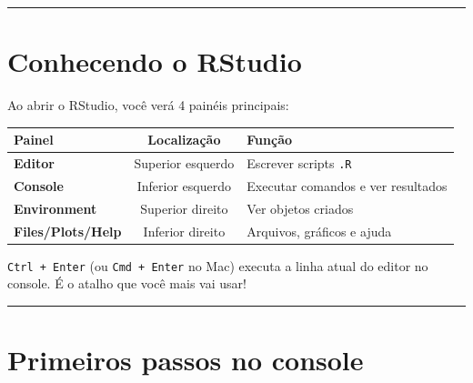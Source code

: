 \documentclass[
  letterpaper,
]{scrbook}
\newcounter{none} %
\begin{document}
\begin{center}\rule{0.5\linewidth}{0.5pt}\end{center}

\section{Conhecendo o RStudio}\label{conhecendo-o-rstudio}

Ao abrir o RStudio, você verá 4 painéis principais:

{\def\LTcaptype{none} %
\begin{longtable}[]{@{}lcl@{}}
\toprule\noalign{}
Painel & Localização & Função \\
\midrule\noalign{}
\endhead
\bottomrule\noalign{}
\endlastfoot
\textbf{Editor} & Superior esquerdo & Escrever scripts \texttt{.R} \\
\textbf{Console} & Inferior esquerdo & Executar comandos e ver
resultados \\
\textbf{Environment} & Superior direito & Ver objetos criados \\
\textbf{Files/Plots/Help} & Inferior direito & Arquivos, gráficos e
ajuda \\
\end{longtable}
}

\begin{tcolorbox}[enhanced jigsaw, arc=.35mm, bottomrule=.15mm, bottomtitle=1mm, breakable, colback=white, colbacktitle=quarto-callout-tip-color!10!white, colframe=quarto-callout-tip-color-frame, coltitle=black, left=2mm, leftrule=.75mm, opacityback=0, opacitybacktitle=0.6, rightrule=.15mm, title=\textcolor{quarto-callout-tip-color}{\faLightbulb}\hspace{0.5em}{Atalho essencial}, titlerule=0mm, toprule=.15mm, toptitle=1mm]

\texttt{Ctrl\ +\ Enter} (ou \texttt{Cmd\ +\ Enter} no Mac) executa a
linha atual do editor no console. É o atalho que você mais vai usar!

\end{tcolorbox}

\begin{center}\rule{0.5\linewidth}{0.5pt}\end{center}

\section{Primeiros passos no console}\label{primeiros-passos-no-console}
\end{document}
